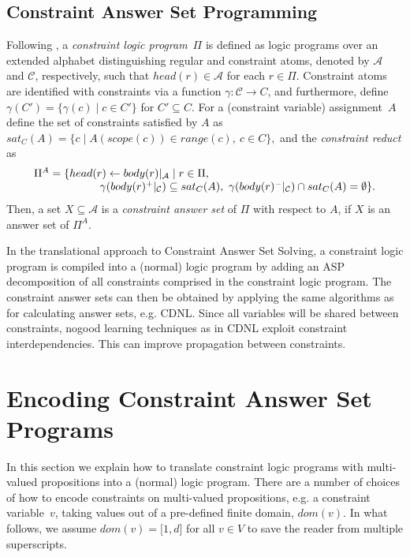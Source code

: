\documentclass{tlp}
\newcommand{\alphabet}{\mathcal{A}}
\newcommand{\calphabet}{\mathcal{C}}
\newcommand{\cassignment}{A}
\newcommand{\head}[1]{head(#1)}
\newcommand{\body}[1]{body(#1)}
\newcommand{\domain}[1]{dom(#1)}
\newcommand{\range}[1]{range(#1)}
\newcommand{\scope}[1]{scope(#1)}
\begin{document}
\subsection{Constraint Answer Set Programming}

Following , a \emph{constraint logic program}~$\Pi$ is defined as logic programs over an extended alphabet distinguishing regular and constraint atoms, denoted by $\alphabet$ and $\calphabet$, respectively, such that $\head{r} \in \alphabet$ for each $r \in \Pi$.
Constraint atoms are identified with constraints via a function $\gamma : \calphabet \to C$, and furthermore, define $\gamma(C') = \{ \gamma(c) \mid c \in C' \}$ for $C' \subseteq C$. For a (constraint variable) assignment~$\cassignment$ define the set of constraints satisfied by $\cassignment$ as
$
sat_C(\cassignment) = \{ c \mid \cassignment(\scope{c}) \in \range{c},\ c \in C\},
$
and the \emph{constraint reduct} as 
\[
\begin{array}{l}
\Pi^{\cassignment} = \{ \head{r} \leftarrow \body{r}|_\alphabet \mid r \in \Pi,\hfill\\ \qquad\qquad\qquad\gamma(\body{r}^{+}|_\calphabet) \subseteq sat_C(\cassignment),\ \gamma(\body{r}^{-}|_\calphabet) \cap sat_C(\cassignment) = \emptyset\}.
\end{array}
\]
Then, a set $X \subseteq \alphabet$ is a \emph{constraint answer set} of $\Pi$ with respect to $\cassignment$, if $X$ is an answer set of $\Pi^\cassignment$.

In the translational approach to Constraint Answer Set Solving, a constraint logic program is compiled into a (normal) logic program by adding an ASP decomposition of all constraints comprised in the constraint logic program. The constraint answer sets can then be obtained by applying the same algorithms as for calculating answer sets, e.g. CDNL. Since all variables will be shared between constraints, nogood learning techniques as in CDNL exploit constraint interdependencies. This can improve propagation between constraints.

\section{Encoding Constraint Answer Set Programs} \label{sec:enc}

In this section we explain how to translate constraint logic programs with multi-valued propositions into a (normal) logic program. There are a number of choices of how to encode constraints on multi-valued propositions, e.g. a constraint variable~$v$, taking values out of a pre-defined finite domain, $\domain{v}$. In what follows, we assume $\domain{v} = \lbrack 1, d\rbrack$ for all $v \in V$ to save the reader from multiple superscripts.
\end{document}
